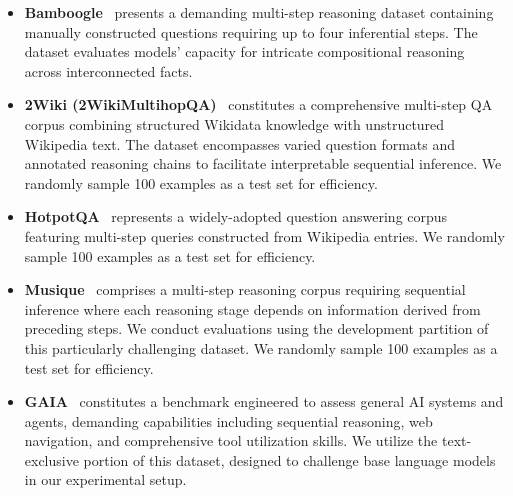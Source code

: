 \begin{itemize}[leftmargin=1em]
    \item \textbf{Bamboogle}~\citep{press2023measuring} presents a demanding multi-step reasoning dataset containing manually constructed questions requiring up to four inferential steps. The dataset evaluates models' capacity for intricate compositional reasoning across interconnected facts.
    \item \textbf{2Wiki (2WikiMultihopQA)}~\citep{ho2020constructing} constitutes a comprehensive multi-step QA corpus combining structured Wikidata knowledge with unstructured Wikipedia text. The dataset encompasses varied question formats and annotated reasoning chains to facilitate interpretable sequential inference. We randomly sample 100 examples as a test set for efficiency.
    \item \textbf{HotpotQA}~\citep{yang2018hotpotqa} represents a widely-adopted question answering corpus featuring multi-step queries constructed from Wikipedia entries. We randomly sample 100 examples as a test set for efficiency.
    \item \textbf{Musique}~\citep{trivedi2022musique} comprises a multi-step reasoning corpus requiring sequential inference where each reasoning stage depends on information derived from preceding steps. We conduct evaluations using the development partition of this particularly challenging dataset. We randomly sample 100 examples as a test set for efficiency.
    \item \textbf{GAIA}~\citep{mialon2023gaia} constitutes a benchmark engineered to assess general AI systems and agents, demanding capabilities including sequential reasoning, web navigation, and comprehensive tool utilization skills. We utilize the text-exclusive portion of this dataset, designed to challenge base language models in our experimental setup.
\end{itemize}



